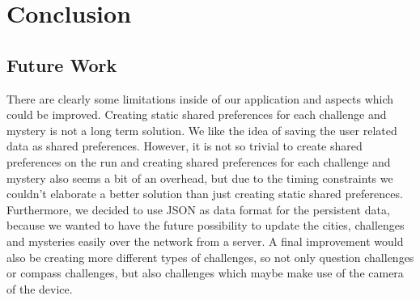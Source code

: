 \chapter{Conclusion}

\section{Future Work}

There are clearly some limitations inside of our application and aspects which could be improved. Creating static shared preferences for each challenge and mystery is not a long term solution. We like the idea of saving the user related data as shared preferences. However, it is not so trivial to create shared preferences on the run and creating shared preferences for each challenge and mystery also seems a bit of an overhead, but due to the timing constraints we couldn't elaborate a better solution than just creating static shared preferences. Furthermore, we decided to use JSON as data format for the persistent data, because we wanted to have the future possibility to update the cities, challenges and mysteries easily over the network from a server. A final improvement would also be creating more different types of challenges, so not only question challenges or compass challenges, but also challenges which maybe make use of the camera of the device.

